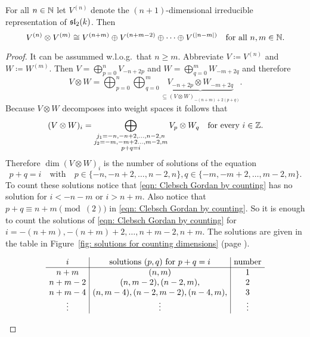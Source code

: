 \begin{prop}
 For all $n \in \mathbb{N}$ let $V^{(n)}$ denote the $(n+1)$-dimensional irreducible representation of $\mathfrak{sl}_2(k)$. Then
 \[
  V^{(n)} \otimes V^{(m)} \cong V^{(n+m)} \oplus V^{(n+m-2)} \oplus \dotsb \oplus V^{(|n-m|)}
  \quad\text{for all $n,m \in \mathbb{N}$}.
 \]
\end{prop}
\begin{proof}
 It can be assummed w.l.o.g.\ that $n \geq m$. Abbreviate $V \coloneqq V^{(n)}$ and $W \coloneqq W^{(m)}$. Then $V = \bigoplus_{p=0}^n V_{-n+2p}$ and $W = \bigoplus_{q=0}^m W_{-m+2q}$ and therefore
 \[
  V \otimes W
  = \bigoplus_{p=0}^n \bigoplus_{q=0}^m \underbrace{V_{-n+2p} \otimes W_{-m+2q}}_{\subseteq (V \otimes W)_{-(n+m)+2(p+q)}}.
 \]
 Because $V \otimes W$ decomposes into weight spaces it follows that
 \[
  (V \otimes W)_i
  = \bigoplus_{\substack{j_1 = -n, -n+2, \dotsc, n-2, n \\ j_2 = -m, -m+2 \dotsc, m-2, m \\ p+q=i}} V_p \otimes W_q
  \quad\text{for every $i \in \mathbb{Z}$}.
 \]
 Therefore $\dim (V \otimes W)_i$ is the number of solutions of the equation
 \begin{equation}\label{eqn: Clebsch Gordan by counting}
  p+q = i
  \quad\text{with}\quad
  p \in \{-n, -n+2, \dotsc, n-2, n\},
  q \in \{-m, -m+2, \dotsc, m-2, m\}.
 \end{equation}
 To count these solutions notice that \eqref{eqn: Clebsch Gordan by counting} has no solution for $i < -n-m$ or $i > n+m$. Also notice that $p+q \equiv n+m\pmod(2)$ in \eqref{eqn: Clebsch Gordan by counting}. So it is enough to count the solutions of \eqref{eqn: Clebsch Gordan by counting} for $i = -(n+m), -(n+m)+2, \dotsc, n+m-2, n+m$. The solutions are given in the table in Figure~\ref{fig: solutions for counting dimensions} (page \pageref{fig: solutions for counting dimensions}).
 \begin{figure}
 \[
  \setlength\arraycolsep{4pt}
  \begin{array}{c|c|c}
  i      & \text{solutions $(p,q)$ for $p+q = i$}        & \text{number} \\
  \hline
  n+m    & (n, m)                                        & 1      \\
  n+m-2  & (n, m-2), (n-2, m),                           & 2      \\
  n+m-4  & (n, m-4), (n-2, m-2), (n-4, m),               & 3      \\
  \vdots & \vdots                                        & \vdots \\

\end{array}\]
\end{figure}
\end{proof}
